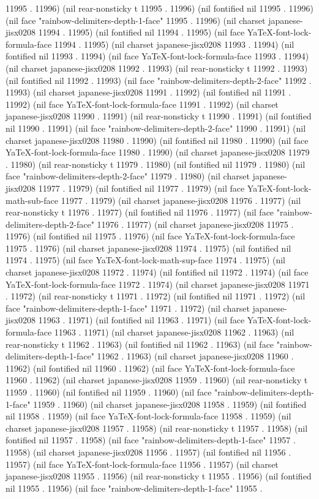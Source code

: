 11995 . 11996) (nil rear-nonsticky t 11995 . 11996) (nil fontified nil 11995 . 11996) (nil face "rainbow-delimiters-depth-1-face" 11995 . 11996) (nil charset japanese-jisx0208 11994 . 11995) (nil fontified nil 11994 . 11995) (nil face YaTeX-font-lock-formula-face 11994 . 11995) (nil charset japanese-jisx0208 11993 . 11994) (nil fontified nil 11993 . 11994) (nil face YaTeX-font-lock-formula-face 11993 . 11994) (nil charset japanese-jisx0208 11992 . 11993) (nil rear-nonsticky t 11992 . 11993) (nil fontified nil 11992 . 11993) (nil face "rainbow-delimiters-depth-2-face" 11992 . 11993) (nil charset japanese-jisx0208 11991 . 11992) (nil fontified nil 11991 . 11992) (nil face YaTeX-font-lock-formula-face 11991 . 11992) (nil charset japanese-jisx0208 11990 . 11991) (nil rear-nonsticky t 11990 . 11991) (nil fontified nil 11990 . 11991) (nil face "rainbow-delimiters-depth-2-face" 11990 . 11991) (nil charset japanese-jisx0208 11980 . 11990) (nil fontified nil 11980 . 11990) (nil face YaTeX-font-lock-formula-face 11980 . 11990) (nil charset japanese-jisx0208 11979 . 11980) (nil rear-nonsticky t 11979 . 11980) (nil fontified nil 11979 . 11980) (nil face "rainbow-delimiters-depth-2-face" 11979 . 11980) (nil charset japanese-jisx0208 11977 . 11979) (nil fontified nil 11977 . 11979) (nil face YaTeX-font-lock-math-sub-face 11977 . 11979) (nil charset japanese-jisx0208 11976 . 11977) (nil rear-nonsticky t 11976 . 11977) (nil fontified nil 11976 . 11977) (nil face "rainbow-delimiters-depth-2-face" 11976 . 11977) (nil charset japanese-jisx0208 11975 . 11976) (nil fontified nil 11975 . 11976) (nil face YaTeX-font-lock-formula-face 11975 . 11976) (nil charset japanese-jisx0208 11974 . 11975) (nil fontified nil 11974 . 11975) (nil face YaTeX-font-lock-math-sup-face 11974 . 11975) (nil charset japanese-jisx0208 11972 . 11974) (nil fontified nil 11972 . 11974) (nil face YaTeX-font-lock-formula-face 11972 . 11974) (nil charset japanese-jisx0208 11971 . 11972) (nil rear-nonsticky t 11971 . 11972) (nil fontified nil 11971 . 11972) (nil face "rainbow-delimiters-depth-1-face" 11971 . 11972) (nil charset japanese-jisx0208 11963 . 11971) (nil fontified nil 11963 . 11971) (nil face YaTeX-font-lock-formula-face 11963 . 11971) (nil charset japanese-jisx0208 11962 . 11963) (nil rear-nonsticky t 11962 . 11963) (nil fontified nil 11962 . 11963) (nil face "rainbow-delimiters-depth-1-face" 11962 . 11963) (nil charset japanese-jisx0208 11960 . 11962) (nil fontified nil 11960 . 11962) (nil face YaTeX-font-lock-formula-face 11960 . 11962) (nil charset japanese-jisx0208 11959 . 11960) (nil rear-nonsticky t 11959 . 11960) (nil fontified nil 11959 . 11960) (nil face "rainbow-delimiters-depth-1-face" 11959 . 11960) (nil charset japanese-jisx0208 11958 . 11959) (nil fontified nil 11958 . 11959) (nil face YaTeX-font-lock-formula-face 11958 . 11959) (nil charset japanese-jisx0208 11957 . 11958) (nil rear-nonsticky t 11957 . 11958) (nil fontified nil 11957 . 11958) (nil face "rainbow-delimiters-depth-1-face" 11957 . 11958) (nil charset japanese-jisx0208 11956 . 11957) (nil fontified nil 11956 . 11957) (nil face YaTeX-font-lock-formula-face 11956 . 11957) (nil charset japanese-jisx0208 11955 . 11956) (nil rear-nonsticky t 11955 . 11956) (nil fontified nil 11955 . 11956) (nil face "rainbow-delimiters-depth-1-face" 11955 . 